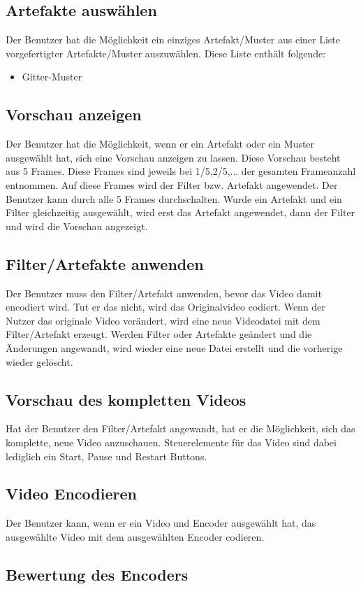 \documentclass[parskip=full]{scrartcl}
\begin{document}
\subsection{Artefakte auswählen}
Der Benutzer hat die Möglichkeit ein einziges Artefakt/Muster aus einer Liste vorgefertigter
Artefakte/Muster auszuwählen. Diese Liste enthält folgende:
\begin{itemize}
\item Gitter-Muster
\end{itemize}
\subsection{Vorschau anzeigen}
Der Benutzer hat die Möglichkeit, wenn er ein Artefakt oder ein Muster ausgewählt hat, sich eine
Vorschau anzeigen zu lassen. Diese Vorschau besteht aus 5 Frames. Diese Frames sind jeweils bei
1/5,2/5,... der gesamten Frameanzahl entnommen. Auf diese Frames wird der Filter bzw. Artefakt
angewendet. Der Benutzer kann durch alle 5 Frames durchschalten. Wurde ein Artefakt und ein Filter
gleichzeitig ausgewählt, wird erst das Artefakt angewendet, dann der Filter und wird die
Vorschau angezeigt.
\subsection{Filter/Artefakte anwenden}
Der Benutzer muss den Filter/Artefakt anwenden, bevor das Video damit encodiert wird. Tut er
das nicht, wird das Originalvideo codiert. Wenn der Nutzer das originale Video verändert, wird eine neue Videodatei mit
dem Filter/Artefakt erzeugt. Werden Filter oder Artefakte geändert und die Änderungen angewandt, wird wieder eine neue
Datei erstellt und die vorherige wieder gelöscht.
\subsection{Vorschau des kompletten Videos}
Hat der Benutzer den Filter/Artefakt angewandt, hat er die Möglichkeit, sich das komplette, neue
Video anzuschauen. Steuerelemente für das Video sind dabei lediglich ein Start, Pause und Restart Buttons.
\subsection{Video Encodieren}
Der Benutzer kann, wenn er ein Video und Encoder ausgewählt hat, das ausgewählte Video mit dem ausgewählten Encoder codieren.
\subsection{Bewertung des Encoders}
\end{document}
